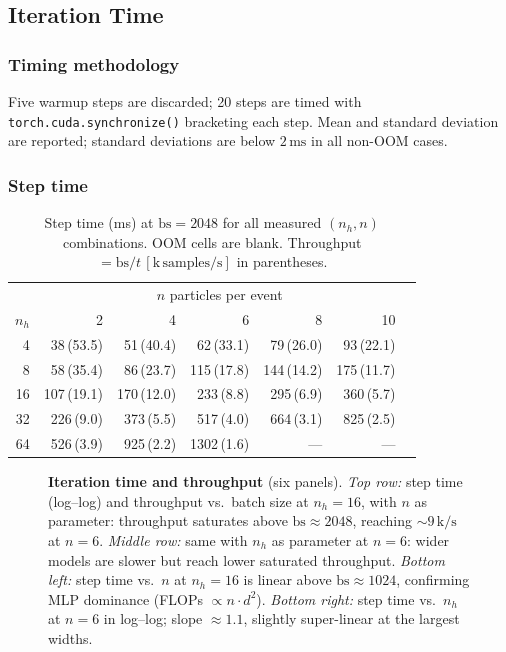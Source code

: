 \subsection{Iteration Time}

\subsubsection{Timing methodology}

Five warmup steps are discarded; 20 steps are timed with
\texttt{torch.cuda.synchronize()} bracketing each step.
Mean and standard deviation are reported; standard deviations are
below $2\,\mathrm{ms}$ in all non-OOM cases.

\subsubsection{Step time}

\begin{table}[h]
\centering
\caption{%
  Step time (ms) at $\mathrm{bs}=2048$ for all measured $(n_h, n)$
  combinations.  OOM cells are blank.
  Throughput $=\mathrm{bs}/t\,[\mathrm{k\,samples/s}]$ in
  parentheses.}
\label{tab:time}
\begin{tabular}{r|rrrrrr}
\hline
     & \multicolumn{5}{c}{$n$ particles per event} \\
$n_h$ & 2 & 4 & 6 & 8 & 10 \\
\hline
 4  & 38\,(53.5) & 51\,(40.4) & 62\,(33.1) & 79\,(26.0) & 93\,(22.1) \\
 8  & 58\,(35.4) & 86\,(23.7) &115\,(17.8) &144\,(14.2) &175\,(11.7) \\
16  &107\,(19.1) &170\,(12.0) &233\,(8.8)  &295\,(6.9)  &360\,(5.7)  \\
32  &226\,(9.0)  &373\,(5.5)  &517\,(4.0)  &664\,(3.1)  &825\,(2.5)  \\
64  &526\,(3.9)  &925\,(2.2)  &1302\,(1.6) &     ---    &     ---    \\
\hline
\end{tabular}
\end{table}

\begin{figure}[h]
  \centering
  \caption{%
    \textbf{Iteration time and throughput} (six panels).
    \textit{Top row:} step time (log--log) and throughput vs.\ batch
    size at $n_h=16$, with $n$ as parameter: throughput saturates
    above $\mathrm{bs}\approx 2048$, reaching $\sim 9\,\mathrm{k/s}$
    at $n=6$.
    \textit{Middle row:} same with $n_h$ as parameter at $n=6$:
    wider models are slower but reach lower saturated throughput.
    \textit{Bottom left:} step time vs.\ $n$ at $n_h=16$ is linear
    above $\mathrm{bs}\approx 1024$, confirming MLP dominance
    (FLOPs $\propto n\cdot d^2$).
    \textit{Bottom right:} step time vs.\ $n_h$ at $n=6$ in log--log;
    slope $\approx 1.1$, slightly super-linear at the largest widths.}
  \label{fig:time}
\end{figure}

